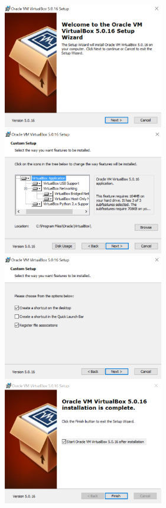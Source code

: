 \documentclass[a4paper,11pt]{report}
\begin{document}
    \includegraphics[width=7cm]{vbox1.PNG}
    \includegraphics[width=7cm]{vbox2.PNG}
    \includegraphics[width=7cm]{vbox3.PNG}
    \includegraphics[width=7cm]{vbox4.PNG} \\
\end{document}

